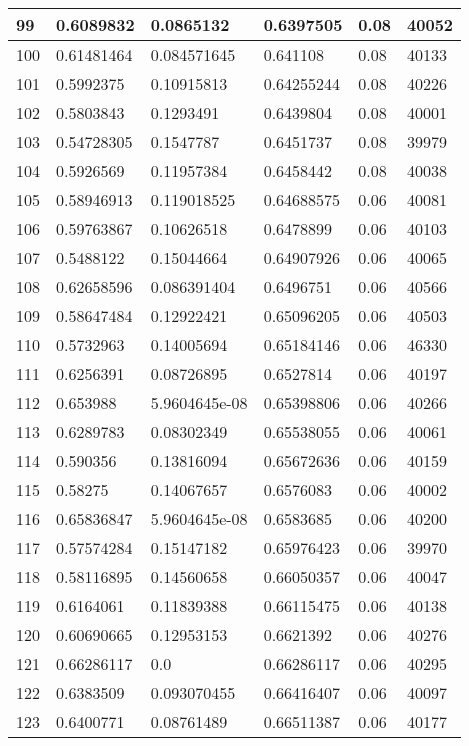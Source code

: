 \begin{longtable}{|l|l|l|l|l|l|}
99 & 0.6089832 & 0.0865132 & 0.6397505 & 0.08 & 40052 \\ \hline 
100 & 0.61481464 & 0.084571645 & 0.641108 & 0.08 & 40133 \\ \hline 
101 & 0.5992375 & 0.10915813 & 0.64255244 & 0.08 & 40226 \\ \hline 
102 & 0.5803843 & 0.1293491 & 0.6439804 & 0.08 & 40001 \\ \hline 
103 & 0.54728305 & 0.1547787 & 0.6451737 & 0.08 & 39979 \\ \hline 
104 & 0.5926569 & 0.11957384 & 0.6458442 & 0.08 & 40038 \\ \hline 
105 & 0.58946913 & 0.119018525 & 0.64688575 & 0.06 & 40081 \\ \hline 
106 & 0.59763867 & 0.10626518 & 0.6478899 & 0.06 & 40103 \\ \hline 
107 & 0.5488122 & 0.15044664 & 0.64907926 & 0.06 & 40065 \\ \hline 
108 & 0.62658596 & 0.086391404 & 0.6496751 & 0.06 & 40566 \\ \hline 
109 & 0.58647484 & 0.12922421 & 0.65096205 & 0.06 & 40503 \\ \hline 
110 & 0.5732963 & 0.14005694 & 0.65184146 & 0.06 & 46330 \\ \hline 
111 & 0.6256391 & 0.08726895 & 0.6527814 & 0.06 & 40197 \\ \hline 
112 & 0.653988 & 5.9604645e-08 & 0.65398806 & 0.06 & 40266 \\ \hline 
113 & 0.6289783 & 0.08302349 & 0.65538055 & 0.06 & 40061 \\ \hline 
114 & 0.590356 & 0.13816094 & 0.65672636 & 0.06 & 40159 \\ \hline 
115 & 0.58275 & 0.14067657 & 0.6576083 & 0.06 & 40002 \\ \hline 
116 & 0.65836847 & 5.9604645e-08 & 0.6583685 & 0.06 & 40200 \\ \hline 
117 & 0.57574284 & 0.15147182 & 0.65976423 & 0.06 & 39970 \\ \hline 
118 & 0.58116895 & 0.14560658 & 0.66050357 & 0.06 & 40047 \\ \hline 
119 & 0.6164061 & 0.11839388 & 0.66115475 & 0.06 & 40138 \\ \hline 
120 & 0.60690665 & 0.12953153 & 0.6621392 & 0.06 & 40276 \\ \hline 
121 & 0.66286117 & 0.0 & 0.66286117 & 0.06 & 40295 \\ \hline 
122 & 0.6383509 & 0.093070455 & 0.66416407 & 0.06 & 40097 \\ \hline 
123 & 0.6400771 & 0.08761489 & 0.66511387 & 0.06 & 40177 \\ \hline 

\end{longtable}
